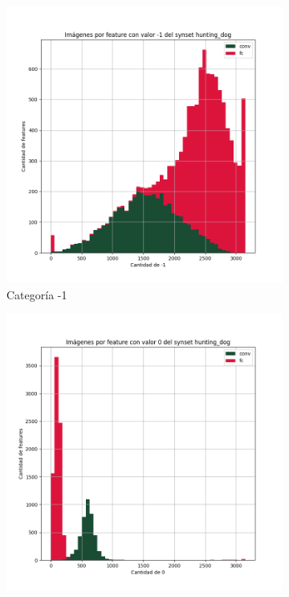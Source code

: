 \documentclass[12,twoside]{TFG-GM}
\theoremstyle{definition}
\theoremstyle{remark}
\begin{document}
\begin{figure}[ht] 
	\centering
	\begin{subfigure}[b]{0.3\textwidth}
		\includegraphics[width=\textwidth] {Images/plots/25/synsets/Images_per_feature_of_-1_category_hunting_dogall_layers.png}
		\caption{Categoría -1}
	\end{subfigure}
	\begin{subfigure}[b]{0.3\textwidth}
		\includegraphics[width=\textwidth]  {Images/plots/25/synsets/Images_per_feature_of_0_category_hunting_dogall_layers.png}

\end{subfigure}
\end{figure}
\end{document}

